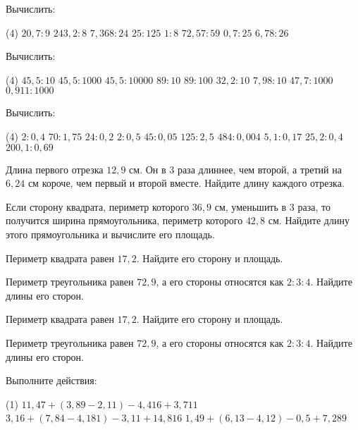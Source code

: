 \begin{class}[number=4]
		\begin{listofex}
			\item Вычислить:
			\begin{tasks}(4)
				\task \( 20,7:9 \)
				\task \( 243,2:8 \)
				\task \( 7,368:24 \)
				\task \( 25:125 \)
				\task \( 1:8 \)
				\task \( 72,57:59 \)
				\task \( 0,7:25 \)
				\task \( 6,78:26 \)
			\end{tasks}
			\item Вычислить:
			\begin{tasks}(4)
				\task \( 45,5:10 \)
				\task \( 45,5:1000 \)
				\task \( 45,5:10000 \)
				\task \( 89:10 \)
				\task \( 89:100 \)
				\task \( 32,2:10 \)
				\task \( 7,98:10 \)
				\task \( 47,7:1000 \)
				\task \( 0,911:1000 \)
			\end{tasks}
			\item Вычислить:
			\begin{tasks}(4)
				\task \( 2:0,4 \)
				\task \( 70:1,75 \)
				\task \( 24:0,2 \)
				\task \( 2:0,5 \)
				\task \( 45:0,05 \)
				\task \( 125:2,5 \)
				\task \( 484:0,004 \)
				\task \( 5,1:0,17 \)
				\task \( 25,2:0,4 \)
				\task \( 200,1:0,69 \)
			\end{tasks}
		\item Длина первого отрезка \( 12,9 \) см. Он в \( 3 \) раза длиннее, чем второй, а третий на \( 6,24 \) см короче, чем первый и второй вместе. Найдите длину каждого отрезка.
		\item Если сторону квадрата, периметр которого \( 36,9 \) см, уменьшить в 3 раза, то получится ширина прямоугольника, периметр которого \( 42,8 \) см. Найдите длину этого прямоугольника и вычислите его площадь.
		\item Периметр квадрата равен \( 17,2 \). Найдите его сторону и площадь.
		\item Периметр треугольника равен \( 72,9 \), а его стороны относятся как \( 2:3:4 \). Найдите длины его сторон.
		\item Периметр квадрата равен \( 17,2 \). Найдите его сторону и площадь.
		\item Периметр треугольника равен \( 72,9 \), а его стороны относятся как \( 2:3:4 \). Найдите длины его сторон.
		\item Выполните действия:
		\begin{tasks}(1)
			\task \( 11,47+(3,89-2,11)-4,416+3,711 \)
			\task \( 3,16+(7,84-4,181)-3,11+14,816 \)
			\task \( 1,49+(6,13-4,12)-0,5+7,289 \)
		\end{tasks}
	\end{listofex}
\end{class}

